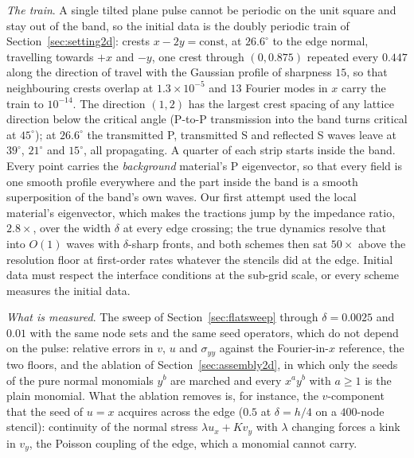 \documentclass[11pt]{amsart}
\theoremstyle{definition}
\theoremstyle{remark}
\newcommand{\para}[1]{\par\smallskip\noindent\textit{#1}.\enspace}
\begin{document}
\para{The train}
A single tilted plane pulse cannot be periodic on the unit square and
stay out of the band, so the initial data is the doubly periodic train
of Section~\ref{sec:setting2d}: crests $x - 2y = \mathrm{const}$, at
$26.6^\circ$ to the edge normal, travelling towards $+x$ and $-y$, one
crest through $(0, 0.875)$ repeated every $0.447$ along the direction of
travel with the Gaussian profile of sharpness $15$, so that neighbouring
crests overlap at $1.3 \times 10^{-5}$ and $13$ Fourier modes in $x$
carry the train to $10^{-14}$. The direction $(1, 2)$ has the largest
crest spacing of any lattice direction below the critical angle (P-to-P
transmission into the band turns critical at $45^\circ$); at $26.6^\circ$
the transmitted P, transmitted S and reflected S waves leave at
$39^\circ$, $21^\circ$ and $15^\circ$, all propagating. A quarter of each
strip starts inside the band. Every point carries the \emph{background}
material's P eigenvector, so that every field is one smooth profile
everywhere and the part inside the band is a smooth superposition of the
band's own waves. Our first attempt used the local material's
eigenvector, which makes the tractions jump by the impedance ratio,
$2.8\times$, over the width $\delta$ at every edge crossing; the true
dynamics resolve that into $O(1)$ waves with $\delta$-sharp fronts, and
both schemes then sat $50\times$ above the resolution floor at
first-order rates whatever the stencils did at the edge. Initial data
must respect the interface conditions at the sub-grid scale, or every
scheme measures the initial data.

\para{What is measured}
The sweep of Section~\ref{sec:flatsweep} through $\delta = 0.0025$ and
$0.01$ with the same node sets and the same seed operators, which do not
depend on the pulse: relative errors in $v$, $u$ and $\sigma_{yy}$
against the Fourier-in-$x$ reference, the two floors, and the ablation
of Section~\ref{sec:assembly2d}, in which only the seeds of the pure
normal monomials $y^b$ are marched and every $x^a y^b$ with $a \ge 1$ is
the plain monomial. What the ablation removes is, for instance, the
$v$-component that the seed of $u = x$ acquires across the edge ($0.5$
at $\delta = h / 4$ on a $400$-node stencil): continuity of the normal
stress $\lambda u_x + K v_y$ with $\lambda$ changing forces a kink in
$v_y$, the Poisson coupling of the edge, which a monomial cannot carry.
\end{document}
